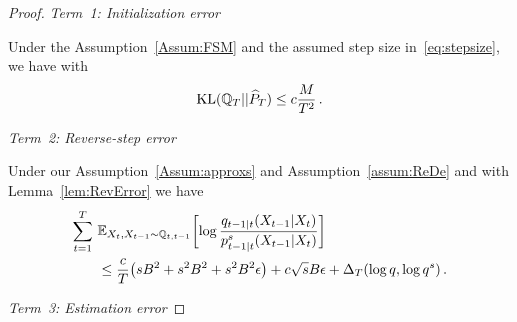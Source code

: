 \begin{proof}
\emph{Term~1: Initialization error}

Under the Assumption~\ref{Assum:FSM} and the assumed step size in~\eqref{eq:stepsize}, we have 
with~\citet[Remark~1]{liang2024nonN} 
\begin{align*}
  \operatorname{KL}(\mathbb{Q}_T||\widehat{P}_T) \le  c\frac{M}{T^2}\,.
\end{align*}



\emph{Term~2: Reverse-step error}

Under our Assumption~\ref{Assum:approxs} and Assumption~\ref{assum:ReDe}
and with Lemma~\ref{lem:RevError} we have  
\begin{align*}
    \sum_{t=1}^{T}~&\textcolor{black}{\mathbb{E}}_{X_t,X_{t-1}\sim \mathbb{Q}_{t,t-1}}\biggl[\log\frac{q_{t-1|t}(X_{t-1}|X_t)}{p^s_{t-1|t}(X_{t-1}|X_t)}\biggr]\notag\\
    &\le  \frac{c}{T}\bigl(sB^2+  s^2B^2+ s^2B^2\epsilon\bigr)+c\sqrt{s}B \epsilon+\Delta_{T} (\log q,\log q^s)\,.
\end{align*}

\emph{Term~3: Estimation error}



\end{proof}

